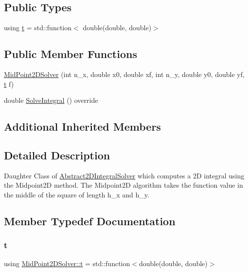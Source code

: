 \subsection*{Public Types}
\begin{DoxyCompactItemize}
\item 
using \hyperlink{class_mid_point2_d_solver_a1f2d1dcde9b60f07f70d3e8581635714}{t} = std\+::function$<$ double(double, double)$>$
\end{DoxyCompactItemize}
\subsection*{Public Member Functions}
\begin{DoxyCompactItemize}
\item 
\hyperlink{class_mid_point2_d_solver_a9cc9f211031ce410a2fe5287db720460}{Mid\+Point2\+D\+Solver} (int n\+\_\+x, double x0, double xf, int n\+\_\+y, double y0, double yf, \hyperlink{class_mid_point2_d_solver_a1f2d1dcde9b60f07f70d3e8581635714}{t} f)
\item 
double \hyperlink{class_mid_point2_d_solver_a45c6c6802b7d40c35f1f60f1a39f5042}{Solve\+Integral} () override
\end{DoxyCompactItemize}
\subsection*{Additional Inherited Members}


\subsection{Detailed Description}
Daughter Class of \hyperlink{class_abstract2_d_integral_solver}{Abstract2\+D\+Integral\+Solver} which computes a 2D integral using the Midpoint2D method. The Midpoint2D algorithm takes the function value in the middle of the square of length h\+\_\+x and h\+\_\+y. 

\subsection{Member Typedef Documentation}
\mbox{\label{class_mid_point2_d_solver_a1f2d1dcde9b60f07f70d3e8581635714}} 
\subsubsection{\texorpdfstring{t}{t}}
{\footnotesize\ttfamily using \hyperlink{class_mid_point2_d_solver_a1f2d1dcde9b60f07f70d3e8581635714}{Mid\+Point2\+D\+Solver\+::t} =  std\+::function$<$double(double, double)$>$}

